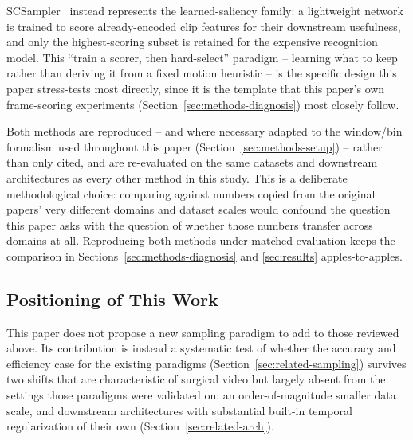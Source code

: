 \documentclass[preprint,12pt]{elsarticle}
\begin{document}
SCSampler~\cite{korbar2019scsampler} instead represents the learned-saliency family: a lightweight network is trained to score already-encoded clip features for their downstream usefulness, and only the highest-scoring subset is retained for the expensive recognition model. This ``train a scorer, then hard-select'' paradigm -- learning what to keep rather than deriving it from a fixed motion heuristic -- is the specific design this paper stress-tests most directly, since it is the template that this paper's own frame-scoring experiments (Section~\ref{sec:methods-diagnosis}) most closely follow.

Both methods are reproduced -- and where necessary adapted to the window/bin formalism used throughout this paper (Section~\ref{sec:methods-setup}) -- rather than only cited, and are re-evaluated on the same datasets and downstream architectures as every other method in this study. This is a deliberate methodological choice: comparing against numbers copied from the original papers' very different domains and dataset scales would confound the question this paper asks with the question of whether those numbers transfer across domains at all. Reproducing both methods under matched evaluation keeps the comparison in Sections~\ref{sec:methods-diagnosis} and \ref{sec:results} apples-to-apples.

\subsection{Positioning of This Work}
\label{sec:related-position}

This paper does not propose a new sampling paradigm to add to those reviewed above. Its contribution is instead a systematic test of whether the accuracy and efficiency case for the existing paradigms (Section~\ref{sec:related-sampling}) survives two shifts that are characteristic of surgical video but largely absent from the settings those paradigms were validated on: an order-of-magnitude smaller data scale, and downstream architectures with substantial built-in temporal regularization of their own (Section~\ref{sec:related-arch}).
\end{document}
